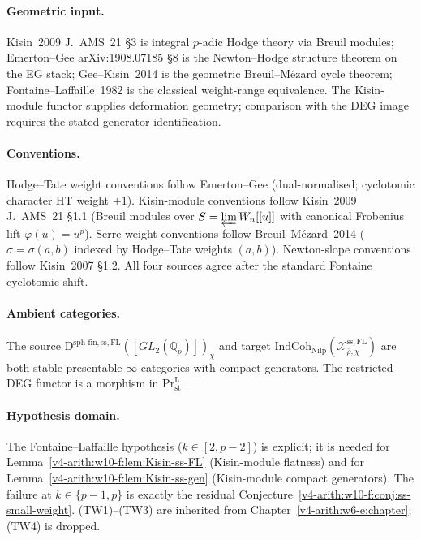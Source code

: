 \paragraph{Geometric input.} Kisin~2009 J.~AMS~21 \S 3 is
integral \(p\)-adic Hodge theory via Breuil modules; Emerton--Gee
arXiv:1908.07185 \S 8 is the Newton--Hodge structure theorem on the
EG stack; Gee--Kisin~2014 is the geometric Breuil--M\'ezard cycle
theorem; Fontaine--Laffaille~1982 is the classical weight-range
equivalence. The Kisin-module functor supplies deformation geometry; comparison
with the DEG image requires the stated generator identification.

\paragraph{Conventions.} Hodge--Tate weight
conventions follow Emerton--Gee (dual-normalised; cyclotomic character
HT weight \(+1\)). Kisin-module conventions follow Kisin~2009
J.~AMS~21 \S 1.1 (Breuil modules over
\(S=\varprojlim W_{n}[[u]]\) with canonical Frobenius lift
\(\varphi(u)=u^{p}\)). Serre weight conventions follow
Breuil--M\'ezard~2014 (\(\sigma=\sigma(a,b)\) indexed by
Hodge--Tate weights \((a,b)\)). Newton-slope conventions follow
Kisin~2007 \S 1.2. All four sources agree after the standard
Fontaine cyclotomic shift.

\paragraph{Ambient categories.} The source
\(\mathrm{D}^{\mathrm{sph\text{-}fin,ss,FL}}([GL_{2}(\mathbb{Q}_{p})])_{\chi}\)
and target
\(\mathrm{IndCoh}_{\mathrm{Nilp}}(\mathcal{X}^{\mathrm{ss,FL}}_{\bar\rho,\chi})\)
are both stable presentable \(\infty\)-categories with compact
generators. The restricted DEG functor is a morphism in
\(\mathrm{Pr}^{\mathrm{L}}_{\mathrm{st}}\).

\paragraph{Hypothesis domain.} The Fontaine--Laffaille hypothesis
(\(k\in[2,p-2]\)) is explicit; it is needed for
Lemma~\ref{v4-arith:w10-f:lem:Kisin-ss-FL} (Kisin-module flatness) and
for Lemma~\ref{v4-arith:w10-f:lem:Kisin-ss-gen} (Kisin-module compact
generators). The failure at \(k\in\{p-1,p\}\) is exactly the residual
Conjecture~\ref{v4-arith:w10-f:conj:ss-small-weight}. (TW1)--(TW3) are inherited
from Chapter~\ref{v4-arith:w6-e:chapter}; (TW4) is dropped.

